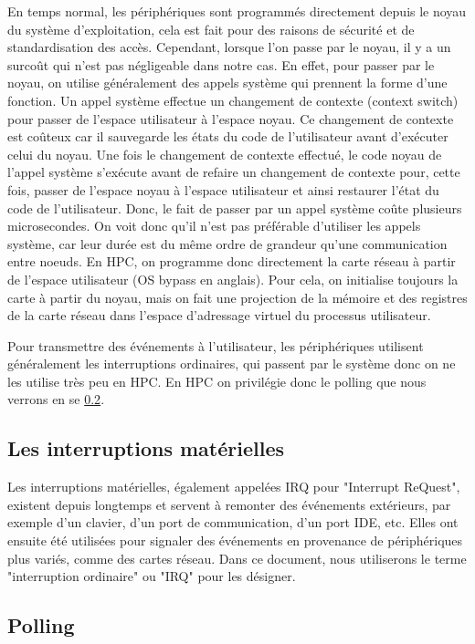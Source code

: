 En temps normal, les périphériques sont programmés directement depuis le noyau du système d'exploitation, cela est fait pour des raisons de sécurité et de standardisation des accès.
Cependant, lorsque l'on passe par le noyau, il y a un surcoût qui n'est pas négligeable dans notre cas.
En effet, pour passer par le noyau, on utilise généralement des appels système qui prennent la forme d'une fonction.
Un appel système effectue un changement de contexte (context switch) pour passer de l'espace utilisateur à l'espace noyau.
Ce changement de contexte est coûteux car il sauvegarde les états du code de l'utilisateur avant d'exécuter celui du noyau.
Une fois le changement de contexte effectué, le code noyau de l'appel système s'exécute avant de refaire un changement de contexte pour, cette fois, passer de l'espace noyau à l'espace utilisateur et ainsi restaurer l'état du code de l'utilisateur.
Donc, le fait de passer par un appel système coûte plusieurs microsecondes.
On voit donc qu'il n'est pas préférable d'utiliser les appels système, car leur durée est du même ordre de grandeur qu'une communication entre noeuds.
En HPC, on programme donc directement la carte réseau à partir de l'espace utilisateur (OS bypass en anglais).
Pour cela, on initialise toujours la carte à partir du noyau, mais on fait une projection de la mémoire et des registres de la carte réseau dans l'espace d'adressage virtuel du processus utilisateur.

Pour transmettre des événements à l'utilisateur, les périphériques utilisent généralement les interruptions ordinaires, qui passent par le système donc on ne les utilise très peu en HPC.
En HPC on privilégie donc le polling que nous verrons en se \ref{sec:polling}.

\subsection{Les interruptions matérielles}

Les interruptions matérielles, également appelées IRQ pour "Interrupt ReQuest", existent depuis longtemps et
servent à remonter des événements extérieurs, par exemple d'un clavier, d'un port de communication, d'un port IDE, etc.
Elles ont ensuite été utilisées pour signaler des événements en provenance de périphériques plus variés, comme des cartes réseau.
Dans ce document, nous utiliserons le terme "interruption ordinaire" ou "IRQ" pour les désigner.

\subsection{Polling}
\label{sec:polling}

